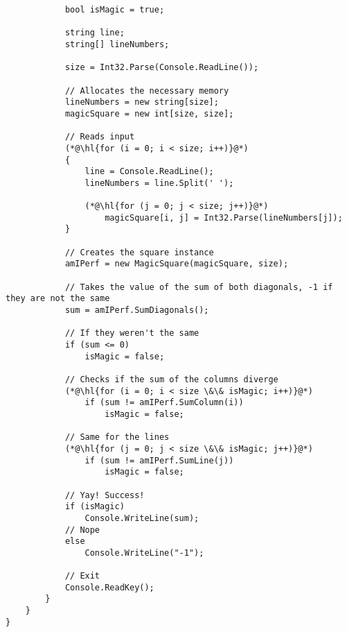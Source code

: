 \documentclass {article}
\begin{document}
\begin{lstlisting}
            bool isMagic = true;

            string line;
            string[] lineNumbers;

            size = Int32.Parse(Console.ReadLine());

            // Allocates the necessary memory
            lineNumbers = new string[size];
            magicSquare = new int[size, size];

            // Reads input
            (*@\hl{for (i = 0; i < size; i++)}@*)
            {
                line = Console.ReadLine();
                lineNumbers = line.Split(' ');

                (*@\hl{for (j = 0; j < size; j++)}@*)
                    magicSquare[i, j] = Int32.Parse(lineNumbers[j]);
            }

            // Creates the square instance
            amIPerf = new MagicSquare(magicSquare, size);

            // Takes the value of the sum of both diagonals, -1 if they are not the same
            sum = amIPerf.SumDiagonals();

            // If they weren't the same
            if (sum <= 0) 
                isMagic = false;

            // Checks if the sum of the columns diverge
            (*@\hl{for (i = 0; i < size \&\& isMagic; i++)}@*)
                if (sum != amIPerf.SumColumn(i))
                    isMagic = false;

            // Same for the lines
            (*@\hl{for (j = 0; j < size \&\& isMagic; j++)}@*)
                if (sum != amIPerf.SumLine(j))
                    isMagic = false;

            // Yay! Success!
            if (isMagic)
                Console.WriteLine(sum);
            // Nope
            else
                Console.WriteLine("-1");

            // Exit
            Console.ReadKey();
        }
    }
}
	\end{lstlisting}
\end{document}
